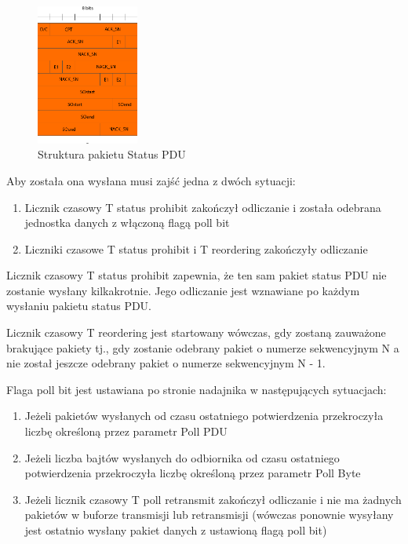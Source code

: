 \begin{figure}
	\centerline{\includegraphics[width=0.3\textwidth]{images/rlc_status_pdu.png}}
	\caption{Struktura pakietu Status PDU}
	\label{fig:status_pdu}
\end{figure}

Aby została ona wysłana musi zajść jedna z dwóch sytuacji:
\begin{enumerate}
	\item Licznik czasowy T status prohibit zakończył odliczanie i została odebrana jednostka danych z włączoną flagą poll bit
	\item Liczniki czasowe T status prohibit i T reordering zakończyły odliczanie
\end{enumerate}

Licznik czasowy T status prohibit zapewnia, że ten sam pakiet status PDU nie zostanie wysłany kilkakrotnie. Jego odliczanie jest wznawiane po każdym wysłaniu pakietu status PDU.

Licznik czasowy T reordering jest startowany wówczas, gdy zostaną zauważone brakujące pakiety tj., gdy zostanie odebrany pakiet o numerze sekwencyjnym N a nie został jeszcze odebrany pakiet o numerze sekwencyjnym N - 1.

Flaga poll bit jest ustawiana po stronie nadajnika w następujących sytuacjach:
\begin{enumerate}
	\item Jeżeli pakietów wysłanych od czasu ostatniego potwierdzenia przekroczyła liczbę określoną przez parametr Poll PDU
	\item Jeżeli liczba bajtów wysłanych do odbiornika od czasu ostatniego potwierdzenia przekroczyła liczbę określoną przez parametr Poll Byte
	\item Jeżeli licznik czasowy T poll retransmit zakończył odliczanie i nie ma żadnych pakietów w buforze transmisji lub retransmisji (wówczas ponownie wysyłany jest ostatnio wysłany pakiet danych z ustawioną flagą poll bit)
\end{enumerate}

